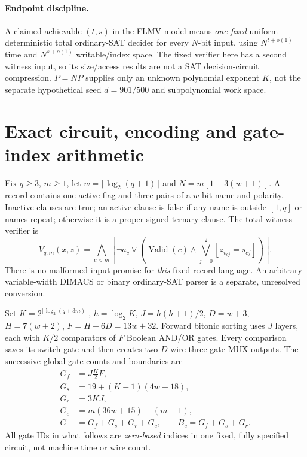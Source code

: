 \documentclass[11pt]{article}
\begin{document}
\paragraph{Endpoint discipline.}
A claimed achievable $(t,s)$ in the FLMV model means \emph{one fixed}
uniform deterministic total ordinary-SAT decider for every $N$-bit
input, using $N^{t+o(1)}$ time and $N^{s+o(1)}$ writable/index
space. The fixed verifier here has a second witness input, so its
size/access results are not a SAT decision-circuit compression.
$P=NP$ supplies only an unknown polynomial exponent $K$, not the
separate hypothetical seed $d=901/500$ and subpolynomial work space.

\section{Exact circuit, encoding and gate-index arithmetic}
Fix $q\ge3$, $m\ge1$, let $w=\lceil\log_2(q+1)\rceil$ and
$N=m[1+3(w+1)]$. A record contains one active flag and three pairs
of a $w$-bit name and polarity. Inactive clauses are true; an
active clause is false if any name is outside $[1,q]$ or names
repeat; otherwise it is a proper signed ternary clause. The total
witness verifier is
\[
V_{q,m}(x,z)=\bigwedge_{c<m}\left[\neg a_c\vee
  \left(\operatorname{Valid}(c)\wedge
    \bigvee_{j=0}^2[z_{v_{cj}}=s_{cj}]\right)\right].\tag{1}
\]
There is no malformed-input promise for \emph{this} fixed-record
language. An arbitrary variable-width DIMACS or binary ordinary-SAT
parser is a separate, unresolved conversion.

Set $K=2^{\lceil\log_2(q+3m)\rceil}$, $h=\log_2K$,
$J=h(h+1)/2$, $D=w+3$, $H=7(w+2)$, $F=H+6D=13w+32$.
Forward bitonic sorting uses $J$ layers, each with $K/2$
comparators of $F$ Boolean AND/OR gates. Every comparison saves its
switch gate and then creates two $D$-wire three-gate MUX outputs.
The successive global gate counts and boundaries are
\begin{align}
G_f&=J\frac K2 F,\\
G_s&=19+(K-1)(4w+18),\\
G_r&=3KJ,\\
G_c&=m(36w+15)+(m-1),\\
G&=G_f+G_s+G_r+G_c,\qquad
B_c=G_f+G_s+G_r.                              \tag{2}
\end{align}
All gate IDs in what follows are \emph{zero-based} indices in one
fixed, fully specified circuit, not machine time or wire count.
\end{document}
